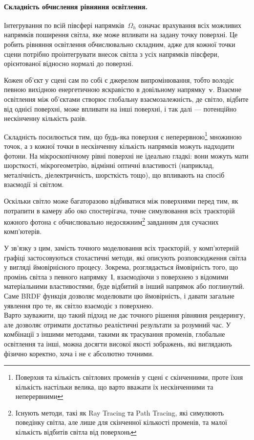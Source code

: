 \paragraph{Складність обчислення рівняння освітлення.}

Інтегрування по всій півсфері напрямків~$\Omega_h$ означає врахування всіх можливих напрямків поширення світла, яке може впливати на задану точку поверхні.
 Це робить рівняння освітлення обчислювально складним, адже для кожної точки сцени потрібно проінтегрувати внесок світла з усіх напрямків півсфери, орієнтованої 
 відносно нормалі до поверхні.

Кожен об’єкт у сцені сам по собі є джерелом випромінювання, тобто володіє певною вихідною енергетичною яскравістю в довільному напрямку~$\mathbf{v}$. Взаємне 
освітлення між об’єктами створює глобальну взаємозалежність, де світло, відбите від однієї поверхні, може впливати на інші поверхні, і так далі — потенційно нескінченну
 кількість разів.

Складність посилюється тим, що будь-яка поверхня є неперервною\footnote{Поверхня та кількість світлових променів у сцені є скінченними, проте їхня кількість настільки велика, 
що варто вважати їх нескінченними та неперервними} множиною точок, а з кожної точки в нескінченну кількість напрямків можуть надходити фотони. На 
мікроскопічному рівні поверхні не ідеально гладкі: вони можуть мати шорсткості, мікрогеометрію, відмінні оптичні властивості (наприклад, металічність, діелектричність,
 шорсткість тощо), що впливають на спосіб взаємодії зі світлом.

Оскільки світло може багаторазово відбиватися між поверхнями перед тим, як потрапити в камеру або око спостерігача, точне симулювання всіх траєкторій кожного 
фотона є обчислювально недосяжним\footnote{Існують методи, такі як Ray Tracing та Path Tracing, які симулюють поведінку світла, але лише для скінченної кількості променів, та
малої кількість відбитів світла від поверхонь} завданням для сучасних комп’ютерів.

У зв’язку з цим, замість точного моделювання всіх траєкторій, у комп’ютерній графіці застосовуються стохастичні методи, які описують розповсюдження світла у вигляді
 ймовірнісного процесу. Зокрема, розглядається ймовірність того, що промінь світла з певного напрямку~$\mathbf{l}$, взаємодіючи з поверхнею з відомими матеріальними 
 властивостями, буде відбитий в інший напрямок або поглинутий. Саме BRDF функція дозволяє моделювати цю ймовірність, і давати загальне уявлення про те, як світло
взаємодіє з поверхнею.\\
Варто зауважити, що такий підхид не дає точного рішення рівняння рендерингу, але дозволяє отримати
достатньо реалістичні результати за розумний час. У комбінації з іншими методами, такими як трасування променів, глобальне освітлення та інші,
можна досягти високої якості зображень, які виглядають фізично коректно, хоча і не є абсолютно точними.



